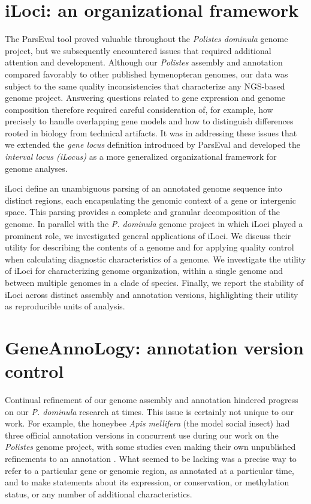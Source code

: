 \section{iLoci: an organizational framework}

The ParsEval tool proved valuable throughout the \textit{Polistes dominula} genome project, but we subsequently encountered issues that required additional attention and development.
Although our \textit{Polistes} assembly and annotation compared favorably to other published hymenopteran genomes, our data was subject to the same quality inconsistencies that characterize any NGS-based genome project.
Answering questions related to gene expression and genome composition therefore required careful consideration of, for example, how precisely to handle overlapping gene models and how to distinguish differences rooted in biology from technical artifacts.
It was in addressing these issues that we extended the \textit{gene locus} definition introduced by ParsEval and developed the \textit{interval locus (iLocus)} as a more generalized organizational framework for genome analyses.

iLoci define an unambiguous parsing of an annotated genome sequence into distinct regions, each encapsulating the genomic context of a gene or intergenic space.
This parsing provides a complete and granular decomposition of the genome.
In parallel with the \textit{P. dominula} genome project in which iLoci played a prominent role, we investigated general applications of iLoci.
We discuss their utility for describing the contents of a genome and for applying quality control when calculating diagnostic characteristics of a genome.
We investigate the utility of iLoci for characterizing genome organization, within a single genome and between multiple genomes in a clade of species.
Finally, we report the stability of iLoci across distinct assembly and annotation versions, highlighting their utility as reproducible units of analysis.

\section{GeneAnnoLogy: annotation version control}

Continual refinement of our genome assembly and annotation hindered progress on our \textit{P. dominula} research at times.
This issue is certainly not unique to our work.
For example, the honeybee \textit{Apis mellifera} (the model social insect) had three official annotation versions in concurrent use during our work on the \textit{Polistes} genome project, with some studies even making their own unpublished refinements to an annotation \cite{Dnmt3KD,TrueSight}.
What seemed to be lacking was a precise way to refer to a particular gene or genomic region, as annotated at a particular time, and to make statements about its expression, or conservation, or methylation status, or any number of additional characteristics.

